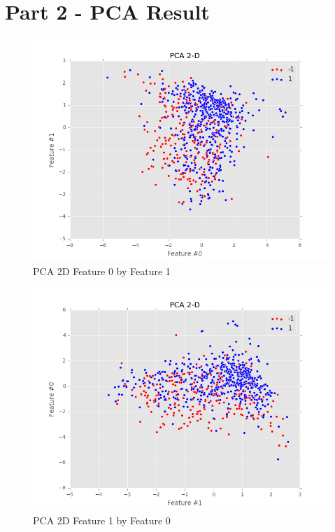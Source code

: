 \documentclass[12pt]{article}
\begin{document}
\section*{Part 2 - PCA Result}
\begin{figure}[H]
\begin{center}
\includegraphics[scale=0.64]{PCA-graph1.png}
\caption{PCA 2D Feature 0 by Feature 1}
\label{PCA-2D-0x1}	
\end{center}
\end{figure}

\begin{figure}[H]
\begin{center}
\includegraphics[scale=0.64]{PCA-graph2.png}
\caption{PCA 2D Feature 1 by Feature 0}
\label{PCA-2D-1x0}	
\end{center}
\end{figure}
\end{document}
